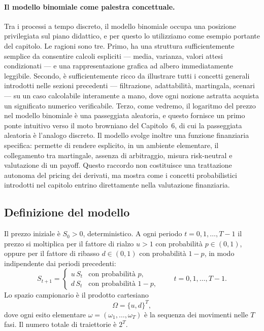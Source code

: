 \paragraph{Il modello binomiale come palestra concettuale.}
Tra i processi a tempo discreto, il modello binomiale occupa una
posizione privilegiata sul piano didattico, e per questo lo
utilizziamo come esempio portante del capitolo. Le ragioni sono tre.
Primo, ha una struttura sufficientemente semplice da consentire calcoli
espliciti --- media, varianza, valori attesi condizionati --- e una
rappresentazione grafica ad albero immediatamente leggibile. Secondo,
\`{e} sufficientemente ricco da illustrare tutti i concetti generali
introdotti nelle sezioni precedenti --- filtrazione, adattabilit\`{a},
martingala, scenari --- su un caso calcolabile interamente a mano,
dove ogni nozione astratta acquista un significato numerico verificabile.
Terzo, come vedremo, il logaritmo del prezzo nel modello binomiale
\`{e} una passeggiata aleatoria, e questo fornisce un primo ponte
intuitivo verso il moto browniano del Capitolo~6, di cui la passeggiata
aleatoria \`{e} l'analogo discreto. Il modello svolge inoltre una funzione finanziaria specifica: permette
di rendere esplicito, in un ambiente elementare, il collegamento tra
martingale, assenza di arbitraggio, misura risk-neutral e valutazione
di un payoff. Questo raccordo non costituisce una trattazione autonoma
del pricing dei derivati, ma mostra come i concetti probabilistici
introdotti nel capitolo entrino direttamente nella valutazione
finanziaria.

\subsection{Definizione del modello}

\noindent
Il prezzo iniziale \`{e} $S_0>0$, deterministico. A ogni periodo
$t=0,1,\ldots,T-1$ il prezzo si moltiplica per il fattore di rialzo
$u>1$ con probabilit\`{a} $p\in(0,1)$, oppure per il fattore di
ribasso $d\in(0,1)$ con probabilit\`{a} $1-p$, in modo indipendente
dai periodi precedenti:
\[
S_{t+1}=\begin{cases}
u\,S_t & \text{con probabilit\`{a} }p,\\
d\,S_t & \text{con probabilit\`{a} }1-p,
\end{cases}
\qquad t=0,1,\ldots,T-1.
\]
Lo spazio campionario \`{e} il prodotto cartesiano
\[
\Omega=\{u,d\}^T,
\]
dove ogni esito elementare $\omega=(\omega_1,\ldots,\omega_T)$ \`{e}
la sequenza dei movimenti nelle $T$ fasi. Il numero totale di
traiettorie \`{e} $2^T$.

